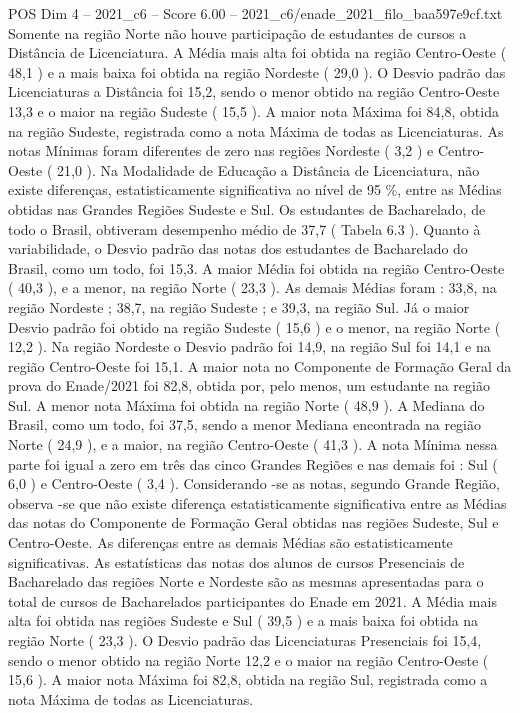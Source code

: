 \begin{textsample}{POS Dim 4 – 2021\_c6 – Score 6.00 – 2021\_c6/enade\_2021\_filo\_baa597e9cf.txt}
Somente na região Norte não houve participação de estudantes de cursos a Distância de Licenciatura.
A Média mais alta foi obtida na região Centro-Oeste ( 48,1 ) e a mais baixa foi obtida na região Nordeste ( 29,0 ).
O Desvio padrão das Licenciaturas a Distância foi 15,2, sendo o menor obtido na região Centro-Oeste 13,3 e o maior na região Sudeste ( 15,5 ).
A maior nota Máxima foi 84,8, obtida na região Sudeste, registrada como a nota Máxima de todas as Licenciaturas.
As notas Mínimas foram diferentes de zero nas regiões Nordeste ( 3,2 ) e Centro-Oeste ( 21,0 ).
Na Modalidade de Educação a Distância de Licenciatura, não existe diferenças, estatisticamente significativa ao nível de 95 \%, entre as Médias obtidas nas Grandes Regiões Sudeste e Sul.
Os estudantes de Bacharelado, de todo o Brasil, obtiveram desempenho médio de 37,7 ( Tabela 6.3 ).
Quanto à variabilidade, o Desvio padrão das notas dos estudantes de Bacharelado do Brasil, como um todo, foi 15,3.
A maior Média foi obtida na região Centro-Oeste ( 40,3 ), e a menor, na região Norte ( 23,3 ).
As demais Médias foram : 33,8, na região Nordeste ; 38,7, na região Sudeste ; e 39,3, na região Sul.
Já o maior Desvio padrão foi obtido na região Sudeste ( 15,6 ) e o menor, na região Norte ( 12,2 ).
Na região Nordeste o Desvio padrão foi 14,9, na região Sul foi 14,1 e na região Centro-Oeste foi 15,1.
A maior nota no Componente de Formação Geral da prova do Enade/2021 foi 82,8, obtida por, pelo menos, um estudante na região Sul.
A menor nota Máxima foi obtida na região Norte ( 48,9 ).
A Mediana do Brasil, como um todo, foi 37,5, sendo a menor Mediana encontrada na região Norte ( 24,9 ), e a maior, na região Centro-Oeste ( 41,3 ).
A nota Mínima nessa parte foi igual a zero em três das cinco Grandes Regiões e nas demais foi : Sul ( 6,0 ) e Centro-Oeste ( 3,4 ).
Considerando -se as notas, segundo Grande Região, observa -se que não existe diferença estatisticamente significativa entre as Médias das notas do Componente de Formação Geral obtidas nas regiões Sudeste, Sul e Centro-Oeste.
As diferenças entre as demais Médias são estatisticamente significativas.
As estatísticas das notas dos alunos de cursos Presenciais de Bacharelado das regiões Norte e Nordeste são as mesmas apresentadas para o total de cursos de Bacharelados participantes do Enade em 2021.
A Média mais alta foi obtida nas regiões Sudeste e Sul ( 39,5 ) e a mais baixa foi obtida na região Norte ( 23,3 ).
O Desvio padrão das Licenciaturas Presenciais foi 15,4, sendo o menor obtido na região Norte 12,2 e o maior na região Centro-Oeste ( 15,6 ).
A maior nota Máxima foi 82,8, obtida na região Sul, registrada como a nota Máxima de todas as Licenciaturas.

\end{textsample}
